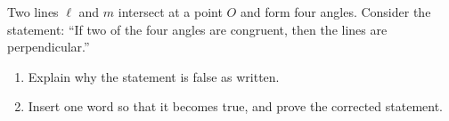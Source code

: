Two lines $\ell$ and $m$ intersect at a point $O$ and form four angles. Consider the statement: ``If two of the four angles are congruent, then the lines are perpendicular.''
\begin{enumerate}
\item[(a)] Explain why the statement is false as written.
\item[(b)] Insert one word so that it becomes true, and prove the corrected statement.
\end{enumerate}
